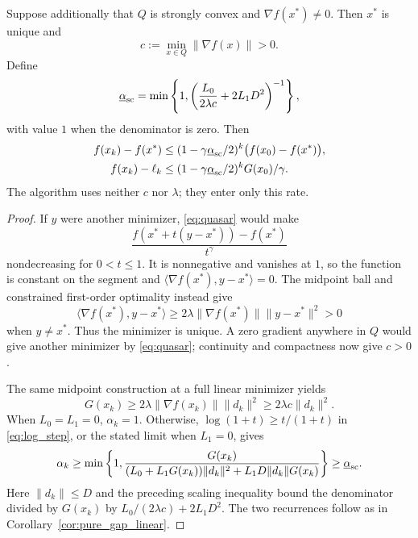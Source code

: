\begin{theorem}
\label{thm:strong_set_linear}
Suppose additionally that $Q$ is strongly convex and
$\nabla f(x^*)\ne0$. Then $x^*$ is unique and
\[
 c:=\min_{x\in Q}\|\nabla f(x)\|>0.
\]
Define
\[
 \underline\alpha_{\rm sc}=
 \min\left\{1,\left(\frac{L_0}{2\lambda c}+2L_1D^2\right)^{-1}\right\},
\]
with value $1$ when the denominator is zero. Then
\begin{align*}
 f(x_k)-f(x^*)&\le
 (1-\gamma\underline\alpha_{\rm sc}/2)^k
       \bigl(f(x_0)-f(x^*)\bigr),\\
 f(x_k)-\ell_k&\le
 (1-\gamma\underline\alpha_{\rm sc}/2)^k G(x_0)/\gamma.
\end{align*}
The algorithm uses neither $c$ nor $\lambda$; they enter only this rate.
\end{theorem}
\begin{proof}
If $y$ were another minimizer, \eqref{eq:quasar} would make
\[
 \frac{f(x^*+t(y-x^*))-f(x^*)}{t^\gamma}
\]
nondecreasing for $0<t\le1$. It is nonnegative and vanishes at $1$,
so the function is constant on the segment and
$\langle\nabla f(x^*),y-x^*\rangle=0$.
The midpoint ball and constrained first-order optimality instead give
\[
 \langle\nabla f(x^*),y-x^*\rangle
 \ge2\lambda\|\nabla f(x^*)\|\|y-x^*\|^2>0
\]
when $y\ne x^*$. Thus the minimizer is unique. A zero gradient anywhere
in $Q$ would give another minimizer by \eqref{eq:quasar}; continuity
and compactness now give $c>0$.

The same midpoint construction at a full linear minimizer yields
\[
 G(x_k)\ge2\lambda\|\nabla f(x_k)\|\|d_k\|^2
           \ge2\lambda c\|d_k\|^2.
\]
When $L_0=L_1=0$, $\alpha_k=1$. Otherwise,
$\log(1+t)\ge t/(1+t)$ in \eqref{eq:log_step}, or the stated limit
when $L_1=0$, gives
\[
 \alpha_k\ge\min\left\{1,
 \frac{G(x_k)}{(L_0+L_1G(x_k))\|d_k\|^2
                      +L_1D\|d_k\|G(x_k)}\right\}
 \ge\underline\alpha_{\rm sc}.
\]
Here $\|d_k\|\le D$ and the preceding scaling inequality bound the
denominator divided by $G(x_k)$ by $L_0/(2\lambda c)+2L_1D^2$.
The two recurrences follow as in Corollary~\ref{cor:pure_gap_linear}.
\end{proof}
